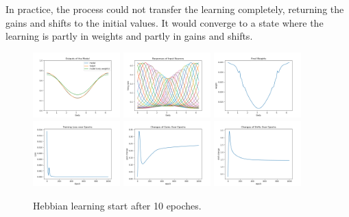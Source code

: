 \documentclass[12pt, a4paper]{article}
\begin{document}
In practice, the process could not transfer the learning completely, returning the gains and shifts to the initial values. It would converge to a state where the learning is partly in weights and partly in gains and shifts. 

\begin{figure}[H]
    \centering
    \includegraphics[width=0.3\textwidth]{FNN/fig/0122_abb05_bphebb_onlyweights.png}
    \includegraphics[width=0.3\textwidth]{FNN/fig/0122_abb05_bphebb_rf.png}
    \includegraphics[width=0.3\textwidth]{FNN/fig/0122_abb05_bphebb_weights.png}
    \\
    \includegraphics[width=0.3\textwidth]{FNN/fig/0122_abb05_bphebb_loss.png}
    \includegraphics[width=0.3\textwidth]{FNN/fig/0122_abb05_bphebb_gc.png}
    \includegraphics[width=0.3\textwidth]{FNN/fig/0122_abb05_bphebb_sc.png}\\
    \caption{Hebbian learning start after 10 epoches.}
\end{figure}
\end{document}

